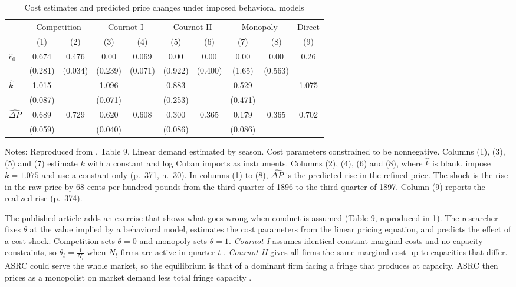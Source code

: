 \begin{table}[htbp]
\centering
\caption{Cost estimates and predicted price changes under imposed behavioral models}\label{tab:03-gm-behavioral}
\small
\setlength{\tabcolsep}{4.2pt}
\begin{tabular}{@{}lccccccccc@{}}
\toprule
 & \multicolumn{2}{c}{Competition} & \multicolumn{2}{c}{Cournot I} & \multicolumn{2}{c}{Cournot II} &
 \multicolumn{2}{c}{Monopoly} & Direct\\
\cmidrule(lr){2-3}\cmidrule(lr){4-5}\cmidrule(lr){6-7}\cmidrule(lr){8-9}\cmidrule(l){10-10}
 & (1) & (2) & (3) & (4) & (5) & (6) & (7) & (8) & (9)\\
\midrule
$\hat c_0$ & 0.674 & 0.476 & 0.00 & 0.069 & 0.00 & 0.00 & 0.00 & 0.00 & 0.26\\
 & (0.281) & (0.034) & (0.239) & (0.071) & (0.922) & (0.400) & (1.65) & (0.563) & \\
$\hat k$ & 1.015 & & 1.096 & & 0.883 & & 0.529 & & 1.075\\
 & (0.087) & & (0.071) & & (0.253) & & (0.471) & & \\
\addlinespace
$\widehat{\Delta P}$ & 0.689 & 0.729 & 0.620 & 0.608 & 0.300 & 0.365 & 0.179 & 0.365 & 0.702\\
 & (0.059) & & (0.040) & & (0.086) & & (0.086) & & \\
\bottomrule
\end{tabular}

\smallskip
\begin{minipage}{0.92\textwidth}\footnotesize
Notes: Reproduced from \citet{GenesoveMullin1998}, Table 9. Linear demand estimated by season. Cost parameters
constrained to be nonnegative. Columns (1), (3), (5) and (7) estimate $k$ with a constant and log Cuban
imports as instruments. Columns (2), (4), (6) and (8), where $\hat k$ is blank, impose $k = 1.075$ and use a
constant only (p.~371, n.~30). In columns (1) to (8),
$\widehat{\Delta P}$ is the predicted rise in the refined price. The shock is the rise in the raw price by 68
cents per hundred pounds from the third quarter of 1896 to the third quarter of 1897. Column (9) reports the
realized rise (p.~374).
\end{minipage}
\end{table}

The published article adds an exercise that shows what goes wrong when conduct is assumed (Table 9,
reproduced in \cref{tab:03-gm-behavioral}). The researcher fixes $\theta$ at the value implied by a behavioral
model, estimates the cost parameters from the linear pricing equation, and predicts the effect of a cost
shock. Competition sets $\theta = 0$ and monopoly sets $\theta = 1$. \emph{Cournot I} assumes identical
constant marginal costs and no capacity constraints, so $\theta_t = \frac{1}{N_t}$ when $N_t$ firms are active
in quarter $t$ \citep[p.~372]{GenesoveMullin1998}. \emph{Cournot II} gives all firms the same marginal cost up
to capacities that differ. ASRC could serve the whole market, so the equilibrium is that of a dominant firm
facing a fringe that produces at capacity. ASRC then prices as a monopolist on market demand less total
fringe capacity \citep[p.~373]{GenesoveMullin1998}.

